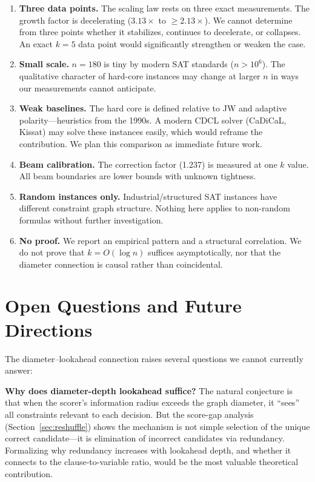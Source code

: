 \documentclass[11pt,a4paper]{article}
\begin{document}
\begin{enumerate}
    \item \textbf{Three data points.} The scaling law rests on three exact measurements. The growth factor is decelerating ($3.13\times$ to ${\geq}2.13\times$). We cannot determine from three points whether it stabilizes, continues to decelerate, or collapses. An exact $k = 5$ data point would significantly strengthen or weaken the case.

    \item \textbf{Small scale.} $n = 180$ is tiny by modern SAT standards ($n > 10^6$). The qualitative character of hard-core instances may change at larger $n$ in ways our measurements cannot anticipate.

    \item \textbf{Weak baselines.} The hard core is defined relative to JW and adaptive polarity---heuristics from the 1990s. A modern CDCL solver (CaDiCaL, Kissat) may solve these instances easily, which would reframe the contribution. We plan this comparison as immediate future work.

    \item \textbf{Beam calibration.} The correction factor (1.237) is measured at one $k$ value. All beam boundaries are lower bounds with unknown tightness.

    \item \textbf{Random instances only.} Industrial/structured SAT instances have different constraint graph structure. Nothing here applies to non-random formulas without further investigation.

    \item \textbf{No proof.} We report an empirical pattern and a structural correlation. We do not prove that $k = O(\log n)$ suffices asymptotically, nor that the diameter connection is causal rather than coincidental.
\end{enumerate}

\section{Open Questions and Future Directions}\label{sec:future}

The diameter--lookahead connection raises several questions we cannot currently answer:

\textbf{Why does diameter-depth lookahead suffice?} The natural conjecture is that when the scorer's information radius exceeds the graph diameter, it ``sees'' all constraints relevant to each decision. But the score-gap analysis (Section~\ref{sec:reshuffle}) shows the mechanism is not simple selection of the unique correct candidate---it is elimination of incorrect candidates via redundancy. Formalizing why redundancy increases with lookahead depth, and whether it connects to the clause-to-variable ratio, would be the most valuable theoretical contribution.
\end{document}
